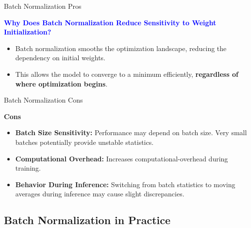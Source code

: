 \documentclass[serif, aspectratio=169]{beamer}
\begin{document}
\begin{frame}{Batch Normalization Pros}

    \textcolor{blue}{\textbf{Why Does Batch Normalization Reduce Sensitivity to Weight Initialization?}}
    \begin{itemize}
        \item Batch normalization smooths the optimization landscape, reducing the dependency on initial weights. 
        \item This allows the model to converge to a minimum efficiently, \textbf{regardless of where optimization begins}.
        


    \end{itemize}
\end{frame}

\begin{frame}{Batch Normalization Cons}

    \textbf{Cons}
    
    \begin{itemize}

        \item \textbf{Batch Size Sensitivity:} Performance may depend on batch size. Very small batches potentially provide unstable statistics.
        \item \textbf{Computational Overhead:} Increases computational-overhead during training.
        \item \textbf{Behavior During Inference:} Switching from batch statistics to moving averages during inference may cause slight discrepancies.

    \end{itemize}
\end{frame}

\subsection{Batch Normalization in Practice}
\end{document}
